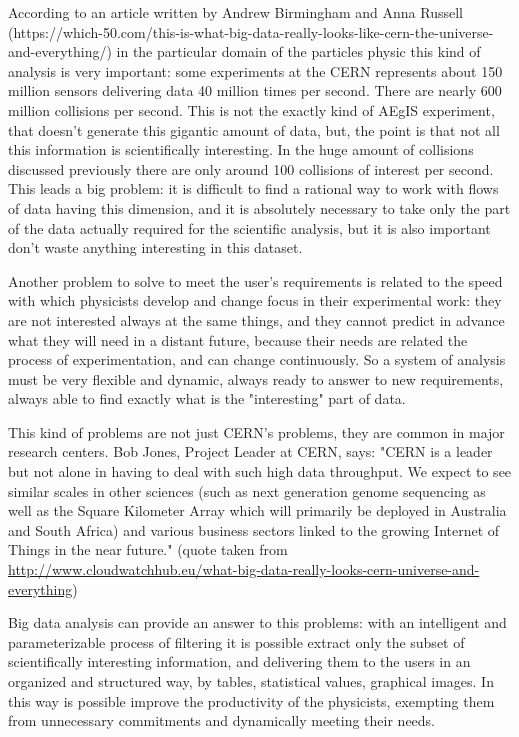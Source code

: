According to an article written by Andrew Birmingham and Anna Russell (https://which-50.com/this-is-what-big-data-really-looks-like-cern-the-universe-and-everything/) in the particular domain of the particles physic this kind of analysis is very important: some experiments at the CERN represents about 150 million sensors delivering data 40 million times per second. There are nearly 600 million collisions per second. This is not the exactly kind of AEgIS experiment, that doesn't generate this gigantic amount of data, but, the point is that not all this information is scientifically interesting. In the huge amount of collisions discussed previously there are only around 100 collisions of interest per second.
This leads a big problem: it is difficult to find a rational way to work with flows of data having this dimension, and it is absolutely necessary to take only the part of the data actually required for the scientific analysis, but it is also important don't waste anything interesting in this dataset.

Another problem to solve to meet the user's requirements is related to the speed with which physicists develop and change focus in their experimental work: they are not interested always at the same things, and they cannot predict in advance what they will need in a distant future, because their needs are related the process of experimentation, and can change continuously. 
So a system of analysis must be very flexible and dynamic, always ready to answer to new requirements, always able to find exactly what is the "interesting" part of data.  

This kind of problems are not just CERN's problems, they are common in major research centers. Bob Jones, Project Leader at CERN, says:
"CERN is a leader but not alone in having to deal with such high data throughput. We expect to see similar scales in other sciences (such as next generation genome sequencing as well as the Square Kilometer Array which will primarily be deployed in Australia and South Africa) and various business sectors linked to the growing Internet of Things in the near future."
(quote taken from \url{http://www.cloudwatchhub.eu/what-big-data-really-looks-cern-universe-and-everything})
 
Big data analysis can provide an answer to this problems: with an intelligent and parameterizable process of filtering it is possible extract only the subset of scientifically interesting information, and delivering them to the users in an organized and structured way, by tables, statistical values, graphical images. 
In this way is possible improve the productivity of the physicists, exempting them from unnecessary commitments and dynamically meeting their needs. 

